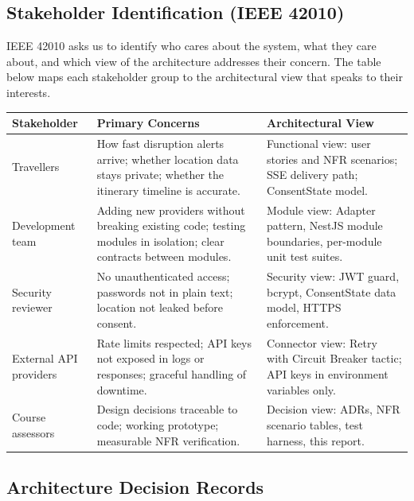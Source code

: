 \documentclass[12pt,a4paper]{article}
\begin{document}
\subsection{Stakeholder Identification (IEEE 42010)}

IEEE 42010 asks us to identify who cares about the system, what they care about, and which view
of the architecture addresses their concern. The table below maps each stakeholder group to the
architectural view that speaks to their interests.

\begin{longtable}{@{}L{3cm}L{4cm}L{5.5cm}@{}}
\toprule
\textbf{Stakeholder} & \textbf{Primary Concerns} & \textbf{Architectural View} \\
\midrule
\endhead

Travellers &
  How fast disruption alerts arrive; whether location data stays private; whether the itinerary
  timeline is accurate. &
  Functional view: user stories and NFR scenarios; SSE delivery path; ConsentState model. \\[0.4em]

Development team &
  Adding new providers without breaking existing code; testing modules in isolation; clear
  contracts between modules. &
  Module view: Adapter pattern, NestJS module boundaries, per-module unit test suites. \\[0.4em]

Security reviewer &
  No unauthenticated access; passwords not in plain text; location not leaked before consent. &
  Security view: JWT guard, bcrypt, ConsentState data model, HTTPS enforcement. \\[0.4em]

External API providers &
  Rate limits respected; API keys not exposed in logs or responses; graceful handling of
  downtime. &
  Connector view: Retry with Circuit Breaker tactic; API keys in environment variables only. \\[0.4em]

Course assessors &
  Design decisions traceable to code; working prototype; measurable NFR verification. &
  Decision view: ADRs, NFR scenario tables, test harness, this report. \\

\bottomrule
\end{longtable}

\subsection{Architecture Decision Records}
\end{document}
